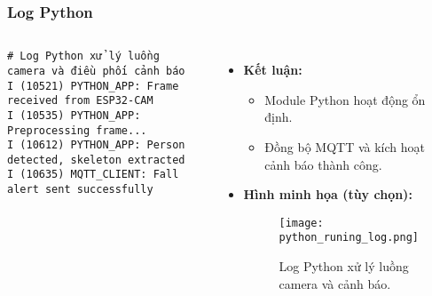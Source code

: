 \begin{frame}[t,fragile]
\frametitle{Log Python}
\begin{columns}[T]
    \begin{verbatim}
# Log Python xử lý luồng camera và điều phối cảnh báo
I (10521) PYTHON_APP: Frame received from ESP32-CAM
I (10535) PYTHON_APP: Preprocessing frame...
I (10612) PYTHON_APP: Person detected, skeleton extracted
I (10635) MQTT_CLIENT: Fall alert sent successfully
    \end{verbatim}

    \begin{itemize}
        \item \textbf{Kết luận:} 
        \begin{itemize}
            \item Module Python hoạt động ổn định.
            \item Đồng bộ MQTT và kích hoạt cảnh báo thành công.
        \end{itemize}
        \item \textbf{Hình minh họa (tùy chọn):}
        \begin{figure}
            \centering
            \texttt{[image: python\_runing\_log.png]}
            \caption{Log Python xử lý luồng camera và cảnh báo.}
        \end{figure}
    \end{itemize}
\end{columns}
\end{frame}



